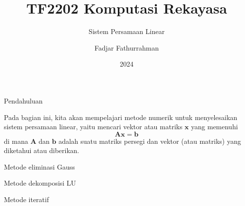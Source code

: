 

\title{TF2202 Komputasi Rekayasa}
\subtitle{Sistem Persamaan Linear}
\author{Fadjar Fathurrahman}
\date{2024}



\frame{\titlepage}

\begin{frame}{Pendahuluan}

Pada bagian ini, kita akan mempelajari metode numerik
untuk menyelesaikan sistem persamaan linear, yaitu mencari
vektor atau matriks $\mathbf{x}$ yang memenuhi
$$
\mathbf{A}\mathbf{x} = \mathbf{b}
$$
di mana $\mathbf{A}$ dan $\mathbf{b}$ adalah suatu matriks persegi dan
vektor (atau matriks) yang diketahui atau diberikan.

Metode eliminasi Gauss

Metode dekomposisi LU

Metode iteratif
\end{frame}





